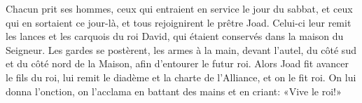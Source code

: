 Chacun prit ses hommes,
	ceux qui entraient en service le jour du sabbat, et ceux qui en sortaient ce jour-là,
	et tous rejoignirent le prêtre Joad.
Celui-ci leur remit les lances et les carquois du roi David,
	qui étaient conservés dans la maison du Seigneur.
Les gardes se postèrent, les armes à la main, devant l’autel,
	du côté sud et du côté nord de la Maison, afin d’entourer le futur roi.
Alors Joad fit avancer le fils du roi,
	lui remit le diadème et la charte de l’Alliance, et on le fit roi.
On lui donna l’onction, on l’acclama en battant des mains et en criant:
	«Vive le roi!»
